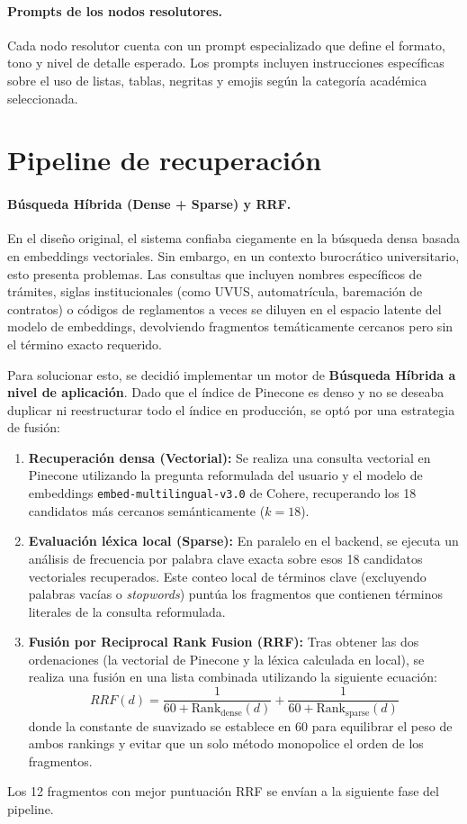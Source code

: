 \documentclass[12pt,a4paper,oneside]{report}
\begin{document}
\paragraph{Prompts de los nodos resolutores.} Cada nodo resolutor cuenta con un prompt especializado que define el formato, tono y nivel de detalle esperado. Los prompts incluyen instrucciones específicas sobre el uso de listas, tablas, negritas y emojis según la categoría académica seleccionada.


\section{Pipeline de recuperación}

\paragraph{Búsqueda Híbrida (Dense + Sparse) y RRF.} En el diseño original, el sistema confiaba ciegamente en la búsqueda densa basada en embeddings vectoriales. Sin embargo, en un contexto burocrático universitario, esto presenta problemas. Las consultas que incluyen nombres específicos de trámites, siglas institucionales (como UVUS, automatrícula, baremación de contratos) o códigos de reglamentos a veces se diluyen en el espacio latente del modelo de embeddings, devolviendo fragmentos temáticamente cercanos pero sin el término exacto requerido.

Para solucionar esto, se decidió implementar un motor de \textbf{Búsqueda Híbrida a nivel de aplicación}. Dado que el índice de Pinecone es denso y no se deseaba duplicar ni reestructurar todo el índice en producción, se optó por una estrategia de fusión:
\begin{enumerate}
    \item \textbf{Recuperación densa (Vectorial):} Se realiza una consulta vectorial en Pinecone utilizando la pregunta reformulada del usuario y el modelo de embeddings \texttt{embed-multilingual-v3.0} de Cohere, recuperando los 18 candidatos más cercanos semánticamente ($k=18$).
    \item \textbf{Evaluación léxica local (Sparse):} En paralelo en el backend, se ejecuta un análisis de frecuencia por palabra clave exacta sobre esos 18 candidatos vectoriales recuperados. Este conteo local de términos clave (excluyendo palabras vacías o \textit{stopwords}) puntúa los fragmentos que contienen términos literales de la consulta reformulada.
    \item \textbf{Fusión por Reciprocal Rank Fusion (RRF):} Tras obtener las dos ordenaciones (la vectorial de Pinecone y la léxica calculada en local), se realiza una fusión en una lista combinada utilizando la siguiente ecuación:
    \[ RRF(d) = \frac{1}{60 + \text{Rank}_{\text{dense}}(d)} + \frac{1}{60 + \text{Rank}_{\text{sparse}}(d)} \]
    donde la constante de suavizado se establece en 60 para equilibrar el peso de ambos rankings y evitar que un solo método monopolice el orden de los fragmentos.
\end{enumerate}
Los 12 fragmentos con mejor puntuación RRF se envían a la siguiente fase del pipeline.
\end{document}
